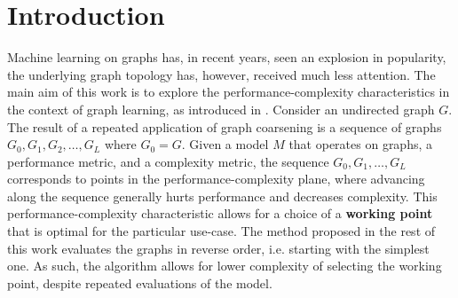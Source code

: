 \section{Introduction}\label{sec:introduction}
Machine learning on graphs has, in recent years, seen an explosion in popularity, the underlying graph topology has, however, received much less attention. The main aim of this work is to explore the performance-complexity characteristics in the context of graph learning, as introduced in \cite{prochazka_downstream_2022}. Consider an undirected graph \( G \). The result of a repeated application of graph coarsening is a sequence of graphs \( G_0, G_1, G_2, \dots, G_L \) where \( G_0 = G \). Given a model \( M \) that operates on graphs, a performance metric, and a complexity metric, the sequence \( G_0, G_1, \dots, G_L \) corresponds to points in the performance-complexity plane, where advancing along the sequence generally hurts performance and decreases complexity. This performance-complexity characteristic allows for a choice of a \textbf{working point} that is optimal for the particular use-case. The method proposed in the rest of this work evaluates the graphs in reverse order, i.e. starting with the simplest one. As such, the algorithm allows for lower complexity of selecting the working point, despite repeated evaluations of the model.
